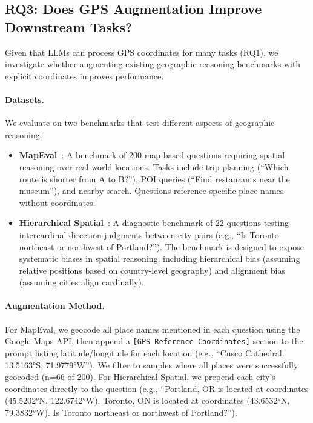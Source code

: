 \subsection{RQ3: Does GPS Augmentation Improve Downstream Tasks?}
\label{sec:rq3_downstream_gps_augmentation}

Given that LLMs can process GPS coordinates for many tasks (RQ1), we investigate whether augmenting existing geographic reasoning benchmarks with explicit coordinates improves performance.

\paragraph{Datasets.}
We evaluate on two benchmarks that test different aspects of geographic reasoning:
\begin{itemize}[leftmargin=*, itemsep=2pt]
    \item \textbf{MapEval}~\cite{mapeval}: A benchmark of 200 map-based questions requiring spatial reasoning over real-world locations. Tasks include trip planning (``Which route is shorter from A to B?''), POI queries (``Find restaurants near the museum''), and nearby search. Questions reference specific place names without coordinates.
    \item \textbf{Hierarchical Spatial}~\cite{fulman2024distortions}: A diagnostic benchmark of 22 questions testing intercardinal direction judgments between city pairs (e.g., ``Is Toronto northeast or northwest of Portland?''). The benchmark is designed to expose systematic biases in spatial reasoning, including hierarchical bias (assuming relative positions based on country-level geography) and alignment bias (assuming cities align cardinally).
\end{itemize}

\paragraph{Augmentation Method.}
For MapEval, we geocode all place names mentioned in each question using the Google Maps API, then append a \texttt{[GPS Reference Coordinates]} section to the prompt listing latitude/longitude for each location (e.g., ``Cusco Cathedral: 13.5163°S, 71.9779°W''). We filter to samples where all places were successfully geocoded (n=66 of 200). For Hierarchical Spatial, we prepend each city's coordinates directly to the question (e.g., ``Portland, OR is located at coordinates (45.5202°N, 122.6742°W). Toronto, ON is located at coordinates (43.6532°N, 79.3832°W). Is Toronto northeast or northwest of Portland?'').

